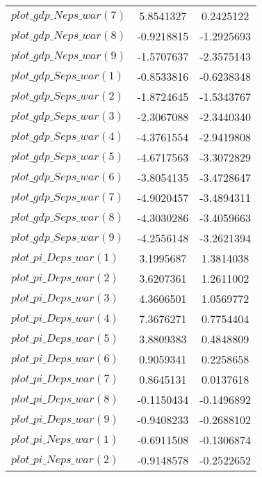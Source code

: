\begin{center}
\begin{longtable}{lcc}
$plot\_gdp\_N eps\_war (7)  $	 & 	      5.8541327	 & 	      0.2425122 \\ 
$plot\_gdp\_N eps\_war (8)  $	 & 	     -0.9218815	 & 	     -1.2925693 \\ 
$plot\_gdp\_N eps\_war (9)  $	 & 	     -1.5707637	 & 	     -2.3575143 \\ 
$plot\_gdp\_S eps\_war (1)  $	 & 	     -0.8533816	 & 	     -0.6238348 \\ 
$plot\_gdp\_S eps\_war (2)  $	 & 	     -1.8724645	 & 	     -1.5343767 \\ 
$plot\_gdp\_S eps\_war (3)  $	 & 	     -2.3067088	 & 	     -2.3440340 \\ 
$plot\_gdp\_S eps\_war (4)  $	 & 	     -4.3761554	 & 	     -2.9419808 \\ 
$plot\_gdp\_S eps\_war (5)  $	 & 	     -4.6717563	 & 	     -3.3072829 \\ 
$plot\_gdp\_S eps\_war (6)  $	 & 	     -3.8054135	 & 	     -3.4728647 \\ 
$plot\_gdp\_S eps\_war (7)  $	 & 	     -4.9020457	 & 	     -3.4894311 \\ 
$plot\_gdp\_S eps\_war (8)  $	 & 	     -4.3030286	 & 	     -3.4059663 \\ 
$plot\_gdp\_S eps\_war (9)  $	 & 	     -4.2556148	 & 	     -3.2621394 \\ 
$plot\_pi\_D eps\_war (1)   $	 & 	      3.1995687	 & 	      1.3814038 \\ 
$plot\_pi\_D eps\_war (2)   $	 & 	      3.6207361	 & 	      1.2611002 \\ 
$plot\_pi\_D eps\_war (3)   $	 & 	      4.3606501	 & 	      1.0569772 \\ 
$plot\_pi\_D eps\_war (4)   $	 & 	      7.3676271	 & 	      0.7754404 \\ 
$plot\_pi\_D eps\_war (5)   $	 & 	      3.8809383	 & 	      0.4848809 \\ 
$plot\_pi\_D eps\_war (6)   $	 & 	      0.9059341	 & 	      0.2258658 \\ 
$plot\_pi\_D eps\_war (7)   $	 & 	      0.8645131	 & 	      0.0137618 \\ 
$plot\_pi\_D eps\_war (8)   $	 & 	     -0.1150434	 & 	     -0.1496892 \\ 
$plot\_pi\_D eps\_war (9)   $	 & 	     -0.9408233	 & 	     -0.2688102 \\ 
$plot\_pi\_N eps\_war (1)   $	 & 	     -0.6911508	 & 	     -0.1306874 \\ 
$plot\_pi\_N eps\_war (2)   $	 & 	     -0.9148578	 & 	     -0.2522652 \\ 

\end{longtable}
\end{center}
